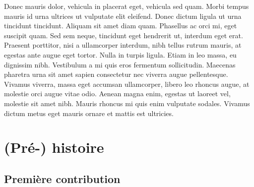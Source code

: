 \documentclass{FramateX}
\begin{document}
Donec mauris dolor, vehicula in placerat eget, vehicula sed quam. Morbi tempus mauris id urna ultrices ut vulputate elit eleifend. Donec dictum ligula ut urna tincidunt tincidunt. Aliquam sit amet diam quam. Phasellus ac orci mi, eget suscipit quam. Sed sem neque, tincidunt eget hendrerit ut, interdum eget erat. Praesent porttitor, nisi a ullamcorper interdum, nibh tellus rutrum mauris, at egestas ante augue eget tortor. Nulla in turpis ligula. Etiam in leo massa, eu dignissim nibh. Vestibulum a mi quis eros fermentum sollicitudin. Maecenas pharetra urna sit amet sapien consectetur nec viverra augue pellentesque. Vivamus viverra, massa eget accumsan ullamcorper, libero leo rhoncus augue, at molestie orci augue vitae odio. Aenean magna enim, egestas ut laoreet vel, molestie sit amet nibh. Mauris rhoncus mi quis enim vulputate sodales. Vivamus dictum metus eget mauris ornare et mattis est ultricies.

                        


                    

\mainmatter
                        
%
\part{(Pré-) histoire}
%

\chapter*{Première contribution} 
{}

\end{document}
